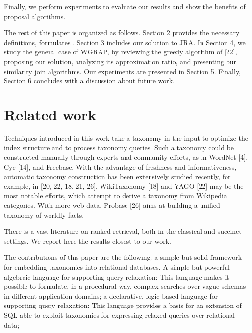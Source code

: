 \documentclass{sig-alternate}
\begin{document}
Finally, we perform experiments to evaluate our results and show the benefits of proposal algorithms.


\smallskip

The rest of this paper is organized as follows. Section 2
provides the necessary definitions, formulates . Section
3 includes our solution to JRA. In Section 4, we study
the general case of WGRAP, by reviewing the greedy algorithm
of [22], proposing our solution, analyzing its approximation
ratio, and presenting our similarity join algorithms.
Our experiments are presented in Section 5. Finally,
Section 6 concludes with a discussion about future work.


\section{Related work} \label{sec:relatedwork}

Techniques introduced in this work take a taxonomy in the
input to optimize the index structure and to process taxonomy
queries. Such a taxonomy could be constructed manually
through experts and community efforts, as in WordNet
[4], Cyc [14], and Freebase. With the advantage of freshness
and informativeness, automatic taxonomy construction has
been extensively studied recently, for example, in [20, 22,
18, 21, 26]. WikiTaxonomy [18] and YAGO [22] may be the
most notable efforts, which attempt to derive a taxonomy
from Wikipedia categories. With more web data, Probase
[26] aims at building a unified taxonomy of worldly facts.

There is a vast literature on ranked retrieval, both in the
classical and succinct settings. We report here the results
closest to our work.


 The contributions of this paper \cite{journals/vldb/MartinenghiT14}   are the following: a simple but solid framework for embedding taxonomies
into relational databases. A simple but powerful algebraic language for supporting
query relaxation: This language makes it possible to formulate, in a procedural way, complex searches over vague schemas in different application domains; a declarative, logic-based language for supporting query
relaxation: This language provides a basis for an extension
of SQL able to exploit taxonomies for expressing relaxed
queries over relational data;
\end{document}
